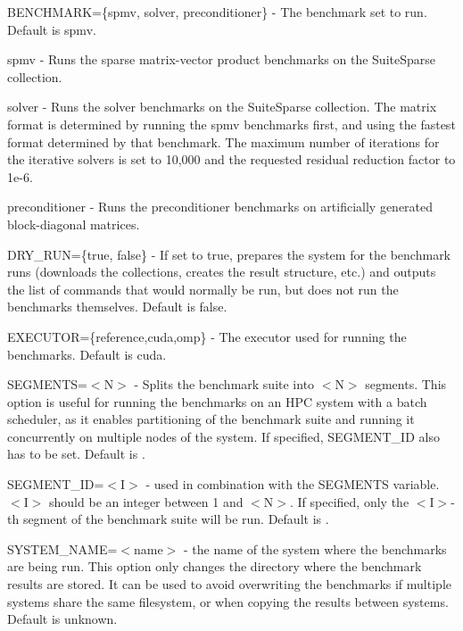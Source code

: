 \begin{DoxyItemize}
\item {\ttfamily B\+E\+N\+C\+H\+M\+A\+RK=\{spmv, solver, preconditioner\}} -\/ The benchmark set to run. Default is {\ttfamily spmv}.
\begin{DoxyItemize}
\item {\ttfamily spmv} -\/ Runs the sparse matrix-\/vector product benchmarks on the Suite\+Sparse collection.
\item {\ttfamily solver} -\/ Runs the solver benchmarks on the Suite\+Sparse collection. The matrix format is determined by running the {\ttfamily spmv} benchmarks first, and using the fastest format determined by that benchmark. The maximum number of iterations for the iterative solvers is set to 10,000 and the requested residual reduction factor to 1e-\/6.
\item {\ttfamily preconditioner} -\/ Runs the preconditioner benchmarks on artificially generated block-\/diagonal matrices.
\end{DoxyItemize}
\item {\ttfamily D\+R\+Y\+\_\+\+R\+UN=\{true, false\}} -\/ If set to {\ttfamily true}, prepares the system for the benchmark runs (downloads the collections, creates the result structure, etc.) and outputs the list of commands that would normally be run, but does not run the benchmarks themselves. Default is {\ttfamily false}.
\item {\ttfamily E\+X\+E\+C\+U\+T\+OR=\{reference,cuda,omp\}} -\/ The executor used for running the benchmarks. Default is {\ttfamily cuda}.
\item {\ttfamily S\+E\+G\+M\+E\+N\+TS=$<$N$>$} -\/ Splits the benchmark suite into {\ttfamily $<$N$>$} segments. This option is useful for running the benchmarks on an H\+PC system with a batch scheduler, as it enables partitioning of the benchmark suite and running it concurrently on multiple nodes of the system. If specified, {\ttfamily S\+E\+G\+M\+E\+N\+T\+\_\+\+ID} also has to be set. Default is {}.
\item {\ttfamily S\+E\+G\+M\+E\+N\+T\+\_\+\+ID=$<$I$>$} -\/ used in combination with the {\ttfamily S\+E\+G\+M\+E\+N\+TS} variable. {\ttfamily $<$I$>$} should be an integer between 1 and {\ttfamily $<$N$>$}. If specified, only the {\ttfamily $<$I$>$}-\/th segment of the benchmark suite will be run. Default is {}.
\item {\ttfamily S\+Y\+S\+T\+E\+M\+\_\+\+N\+A\+ME=$<$name$>$} -\/ the name of the system where the benchmarks are being run. This option only changes the directory where the benchmark results are stored. It can be used to avoid overwriting the benchmarks if multiple systems share the same filesystem, or when copying the results between systems. Default is {\ttfamily unknown}.
\end{DoxyItemize}

